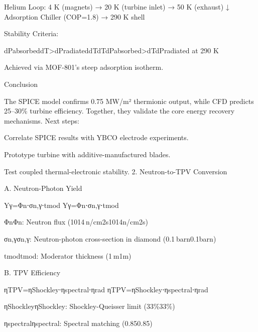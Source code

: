 \documentclass{article}
\begin{document}
Helium Loop: 4 K (magnets) → 20 K (turbine inlet) → 50 K (exhaust) ↓
Adsorption Chiller (COP=1.8) → 290 K shell

Stability Criteria:

dPabsorbeddT\textgreater dPradiateddTdTdPabsorbed\hspace{0pt}\hspace{0pt}\textgreater dTdPradiated\hspace{0pt}\hspace{0pt}
at 290 K

Achieved via MOF-801's steep adsorption isotherm.

Conclusion

The SPICE model confirms 0.75 MW/m² thermionic output, while CFD
predicts 25--30\% turbine efficiency. Together, they validate the core
energy recovery mechanisms. Next steps:

Correlate SPICE results with YBCO electrode experiments.

Prototype turbine with additive-manufactured blades.

Test coupled thermal-electronic stability. 2. Neutron-to-TPV Conversion

A. Neutron-Photon Yield

Yγ=Φn⋅σn,γ⋅tmod
Yγ\hspace{0pt}=Φn\hspace{0pt}⋅σn,γ\hspace{0pt}⋅tmod\hspace{0pt}

ΦnΦn\hspace{0pt}: Neutron flux (1014 n/cm2s1014n/cm2s)

σn,γσn,γ\hspace{0pt}: Neutron-photon cross-section in diamond
(0.1 barn0.1barn)

tmodtmod\hspace{0pt}: Moderator thickness (1 m1m)

B. TPV Efficiency

ηTPV=ηShockley⋅ηspectral⋅ηrad
ηTPV\hspace{0pt}=ηShockley\hspace{0pt}⋅ηspectral\hspace{0pt}⋅ηrad\hspace{0pt}

ηShockleyηShockley\hspace{0pt}: Shockley-Queisser limit (33\%33\%)

ηspectralηspectral\hspace{0pt}: Spectral matching (0.850.85)
\end{document}

